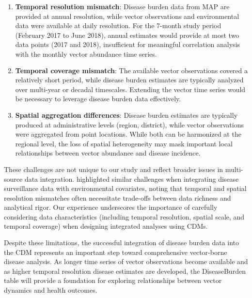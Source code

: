 \documentclass{article}
\begin{document}
\begin{enumerate}
    \item \textbf{Temporal resolution mismatch}: Disease burden data from MAP are provided at annual resolution, while vector 
    observations and environmental data were available at daily resolution. For the 7-month study period (February 2017 to 
    June 2018), annual estimates would provide at most two data points (2017 and 2018), insufficient for meaningful correlation 
    analysis with the monthly vector abundance time series.

    \item \textbf{Temporal coverage mismatch}: The available vector observations covered a relatively short period, while 
    disease burden estimates are typically analyzed over multi-year or decadal timescales. Extending the vector time series 
    would be necessary to leverage disease burden data effectively.

    \item \textbf{Spatial aggregation differences}: Disease burden estimates are typically produced at administrative levels 
    (region, district), while vector observations were aggregated from point locations. While both can be harmonized at the 
    regional level, the loss of spatial heterogeneity may mask important local relationships between vector abundance and 
    disease incidence.
\end{enumerate}

\par
These challenges are not unique to our study and reflect broader issues in multi-source data integration. \citet{2015.DD.FKC} 
highlighted similar challenges when integrating disease surveillance data with environmental covariates, noting that temporal 
and spatial resolution mismatches often necessitate trade-offs between data richness and analytical rigor. Our experience 
underscores the importance of carefully considering data characteristics (including temporal resolution, spatial scale, 
and temporal coverage) when designing integrated analyses using CDMs.
\par
Despite these limitations, the successful integration of disease burden data into the CDM represents an important step 
toward comprehensive vector-borne disease analysis. As longer time series of vector observations become available and 
as higher temporal resolution disease estimates are developed, the DiseaseBurden table will provide a foundation for 
exploring relationships between vector dynamics and health outcomes.
\end{document}
